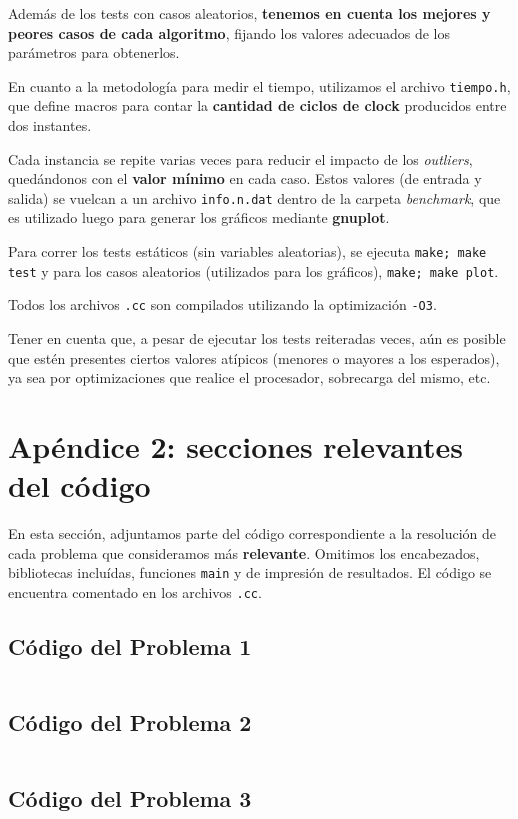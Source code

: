 \documentclass[a4paper]{article}
\begin{document}
Además de los tests con casos aleatorios, \textbf{tenemos en cuenta los mejores y peores
casos de cada algoritmo}, fijando los valores adecuados de los parámetros para
obtenerlos. \medskip

En cuanto a la metodología para medir el tiempo, utilizamos el archivo \verb|tiempo.h|,
que define macros para contar la \textbf{cantidad de ciclos de clock} producidos entre dos instantes. \medskip

Cada instancia se repite varias veces para reducir el impacto de los \textit{outliers}, quedándonos
con el \textbf{valor mínimo} en cada caso. Estos valores (de entrada y salida) se vuelcan a un archivo
\verb|info.n.dat| dentro de la carpeta \textit{benchmark}, que es utilizado luego para generar los gráficos
mediante \textbf{gnuplot}. \medskip

Para correr los tests estáticos (sin variables aleatorias), se ejecuta \verb|make; make test| y para los
casos aleatorios (utilizados para los gráficos), \verb|make; make plot|.

Todos los archivos \verb|.cc| son compilados utilizando la optimización \verb|-O3|. \medskip

Tener en cuenta que, a pesar de ejecutar los tests reiteradas veces, aún es posible que estén presentes ciertos
valores atípicos (menores o mayores a los esperados), ya sea por optimizaciones que realice el procesador, sobrecarga
del mismo, etc.
\newpage

\section{Apéndice 2: secciones relevantes del código}

En esta sección, adjuntamos parte del código correspondiente a la resolución de cada problema
que consideramos más \textbf{relevante}. Omitimos los encabezados, bibliotecas incluídas,
funciones \verb|main| y de impresión de resultados. El código se encuentra comentado en los
archivos \verb|.cc|.

\subsection{Código del Problema 1}


\begin{lstlisting}
\end{lstlisting}

\vspace*{0.5cm}


\newpage


\subsection{Código del Problema 2}


\begin{lstlisting}
\end{lstlisting}

\vspace*{0.5cm}


\newpage


\subsection{Código del Problema 3}


\begin{lstlisting}
\end{lstlisting}

\vspace*{0.5cm}
\end{document}
